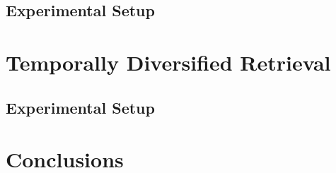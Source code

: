 \documentclass{sig-alternate}
\begin{document}
\subsection{Experimental Setup}
\section{Temporally Diversified Retrieval}
\subsection{Experimental Setup}
\section{Conclusions}





\end{document}

